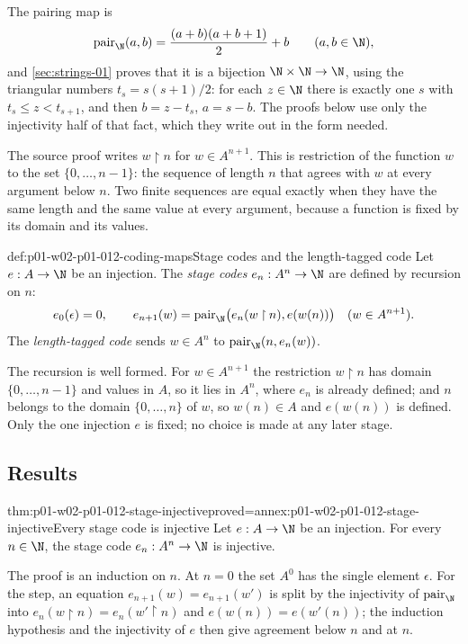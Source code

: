 The pairing map is
\[
  \operatorname{pair}_{\N}(a,b)=\frac{(a+b)(a+b+1)}2+b
  \qquad(a,b\in\N),
\]
and \cref{sec:strings-01} proves that it is a bijection
\(\N\times\N\to\N\), using the triangular numbers \(t_s=s(s+1)/2\): for each
\(z\in\N\) there is exactly one \(s\) with \(t_s\leq z<t_{s+1}\), and then
\(b=z-t_s\), \(a=s-b\). The proofs below use only the injectivity half of
that fact, which they write out in the form needed.

The source proof writes \(w\mathbin{\upharpoonright}n\) for
\(w\in A^{n+1}\). This is restriction of the function \(w\) to the set
\(\{0,\ldots,n-1\}\): the sequence of length \(n\) that agrees with \(w\) at
every argument below \(n\). Two finite sequences are equal exactly when they
have the same length and the same value at every argument, because a function
is fixed by its domain and its values.

\begin{hbdefinition}{def:p01-w02-p01-012-coding-maps}{Stage codes and the length-tagged code}
Let \(e:A\to\N\) be an injection. The \emph{stage codes}
\(e_n:A^n\to\N\) are defined by recursion on \(n\):
\[
  e_0(\epsilon)=0,
  \qquad
  e_{n+1}(w)=\operatorname{pair}_{\N}\bigl(e_n(w\mathbin{\upharpoonright}n),
    e(w(n))\bigr)\quad(w\in A^{n+1}).
\]
The \emph{length-tagged code} sends \(w\in A^n\) to
\(\operatorname{pair}_{\N}(n,e_n(w))\).
\end{hbdefinition}

The recursion is well formed. For \(w\in A^{n+1}\) the restriction
\(w\mathbin{\upharpoonright}n\) has domain \(\{0,\ldots,n-1\}\) and values in
\(A\), so it lies in \(A^n\), where \(e_n\) is already defined; and
\(n\) belongs to the domain \(\{0,\ldots,n\}\) of \(w\), so \(w(n)\in A\)
and \(e(w(n))\) is defined. Only the one injection \(e\) is fixed; no choice
is made at any later stage.

\subsection{Results}
\label{sec:p01-w02-p01-012-results}

\begin{hblemma}{thm:p01-w02-p01-012-stage-injective}{proved=annex:p01-w02-p01-012-stage-injective}{Every stage code is injective}
Let \(e:A\to\N\) be an injection. For every \(n\in\N\), the stage code
\(e_n:A^n\to\N\) is injective.
\end{hblemma}

The proof is an induction on \(n\). At \(n=0\) the set \(A^0\) has the single
element \(\epsilon\). For the step, an equation
\(e_{n+1}(w)=e_{n+1}(w')\) is split by the injectivity of
\(\operatorname{pair}_{\N}\) into
\(e_n(w\mathbin{\upharpoonright}n)=e_n(w'\mathbin{\upharpoonright}n)\) and
\(e(w(n))=e(w'(n))\); the induction hypothesis and the injectivity of \(e\)
then give agreement below \(n\) and at \(n\).

